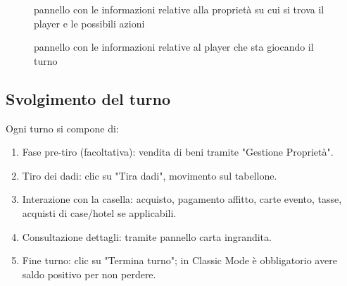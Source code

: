 \begin{figure}[H]
    \centering
    \caption{pannello con le informazioni relative alla proprietà su cui si trova il player e le possibili azioni}
	\label{img:gamescreen6}
\end{figure}
\begin{figure}[H]
    \centering
    \caption{pannello con le informazioni relative al player che sta giocando il turno}
	\label{img:gamescreen7}
\end{figure}
\subsection{Svolgimento del turno}
Ogni turno si compone di:
\begin{enumerate}
    \item Fase pre-tiro (facoltativa): vendita di beni tramite "Gestione Proprietà".
    \item Tiro dei dadi: clic su "Tira dadi", movimento sul tabellone.
    \item Interazione con la casella: acquisto, pagamento affitto, carte evento, tasse, acquisti di case/hotel se applicabili.
    \item Consultazione dettagli: tramite pannello carta ingrandita.
    \item Fine turno: clic su "Termina turno"; in Classic Mode è obbligatorio avere saldo positivo per non perdere.
\end{enumerate}

